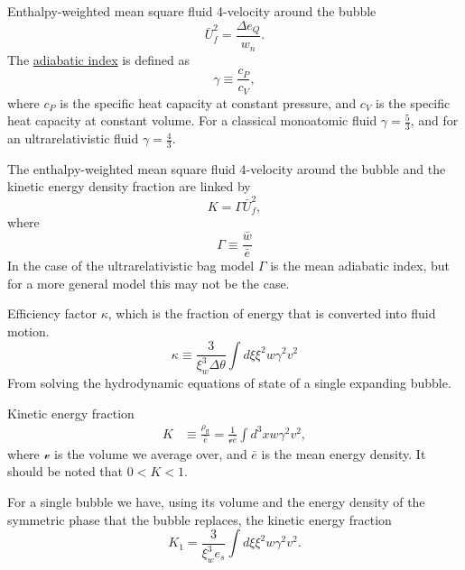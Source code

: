Enthalpy-weighted mean square fluid 4-velocity around the bubble
\begin{equation}
\bar{U}_f^2 = \frac{\Delta e_Q}{w_n}.
\end{equation}
The \href{https://en.wikipedia.org/wiki/Heat_capacity_ratio}{adiabatic index} is defined as
\begin{equation}
\gamma \equiv \frac{c_P}{c_V},
\end{equation}
where $c_P$ is the specific heat capacity at constant pressure,
and $c_V$ is the specific heat capacity at constant volume.
For a classical monoatomic fluid $\gamma = \frac{5}{3}$,
and for an ultrarelativistic fluid $\gamma = \frac{4}{3}$.

The enthalpy-weighted mean square fluid 4-velocity around the bubble and the kinetic energy density fraction are linked by
\begin{equation}
K = \Gamma \bar{U}_f^2,
\end{equation}
where
\begin{equation}
\Gamma \equiv \frac{\bar{w}}{\bar{e}}
\end{equation}
In the case of the ultrarelativistic bag model $\Gamma$ is the mean adiabatic index,
but for a more general model this may not be the case.


\iffalse
Efficiency factor $\kappa$, which is the fraction of energy that is converted into fluid motion.
\begin{equation}
\kappa \equiv \frac{3}{\xi_w^3 \Delta \theta} \int d\xi \xi^2 w \gamma^2 v^2
\end{equation}
From solving the hydrodynamic equations of state of a single expanding bubble.

Kinetic energy fraction
\cites[eq. 7.36]{lecture_notes}[eq. 5]{giese_2020}
\begin{align}
K
&\equiv \frac{\rho_\text{fl}}{\bar{e}}
= \frac{1}{\mathcal{v} \bar{e}} \int d^3 x w \gamma^2 v^2,
\end{align}
where $\mathcal{v}$ is the volume we average over, and $\bar{e}$ is the mean energy density.
It should be noted that $0 < K < 1$.
\cite{giese_2020}

For a single bubble we have, using its volume and the energy density of the symmetric phase that the bubble replaces, the kinetic energy fraction
\cites[eq. 7.37]{lecture_notes}[eq. 5]{giese_2020}
\begin{equation}
K_1 = \frac{3}{\xi_w^3 e_s} \int d\xi \xi^2 w \gamma^2 v^2.
\end{equation}

